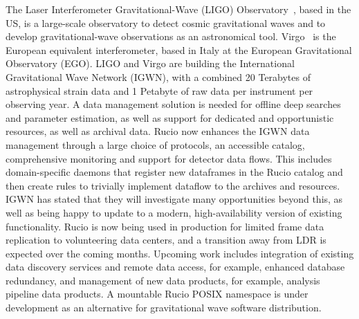 \documentclass[11pt]{article}
\begin{document}
The Laser Interferometer Gravitational-Wave (LIGO) Observatory~\cite{ligo}, based in the US, is a large-scale observatory to detect cosmic gravitational waves and to develop gravitational-wave observations as an astronomical tool. Virgo~\cite{virgo} is the European equivalent interferometer, based in Italy at the European Gravitational Observatory (EGO). LIGO and Virgo are building the International Gravitational Wave Network (IGWN), with a combined 20 Terabytes of astrophysical strain data and 1 Petabyte of raw data per instrument per observing year. A data management solution is needed for offline deep searches and parameter estimation, as well as support for dedicated and opportunistic resources, as well as archival data. Rucio now enhances the IGWN data management through a large choice of protocols, an accessible catalog, comprehensive monitoring and support for detector data flows. This includes domain-specific daemons that register new dataframes in the Rucio catalog and then create rules to trivially implement dataflow to the archives and resources. IGWN has stated that they will investigate many opportunities beyond this, as well as being happy to update to a modern, high-availability version of existing functionality. Rucio is now being used in production for limited frame data replication to volunteering data centers, and a transition away from LDR is expected over the coming months. Upcoming work includes integration of existing data discovery services and remote data access, for example, enhanced database redundancy, and management of new data products, for example, analysis pipeline data products. A mountable Rucio POSIX namespace is under development as an alternative for gravitational wave software distribution.
\end{document}
